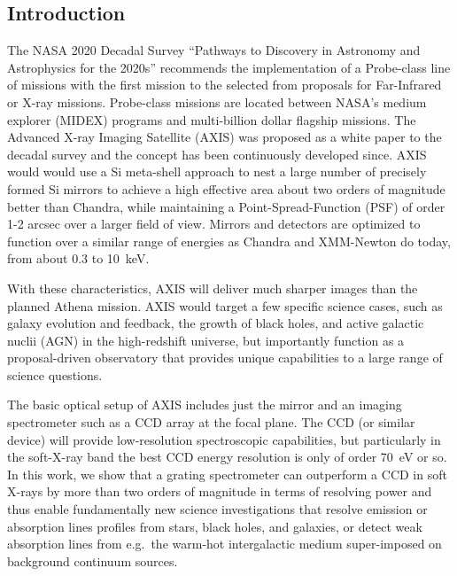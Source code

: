 \documentclass[12pt]{spieman}  %
\begin{document}
\begin{spacing}{1}



\section{Introduction}
\label{sect:introduction}
The NASA 2020 Decadal Survey ``Pathways to Discovery in Astronomy and Astrophysics for the 2020s''\cite{2021pdaa.book.....N} recommends the implementation of a Probe-class line of missions with the first mission to the selected from proposals for Far-Infrared or X-ray missions. Probe-class missions are located between NASA's medium explorer (MIDEX) programs and multi-billion dollar flagship missions. The Advanced X-ray Imaging Satellite (AXIS) was proposed as a white paper \cite{2019BAAS...51g.107M} to the decadal survey and the concept has been continuously developed since. AXIS would would use a Si meta-shell approach to nest a large number of precisely formed Si mirrors to achieve a high effective area about two orders of magnitude better than Chandra, while maintaining a Point-Spread-Function (PSF) of order 1-2 arcsec over a larger field of view. Mirrors and detectors are optimized to function over a similar range of energies as Chandra and XMM-Newton do today, from about 0.3 to 10~keV.

With these characteristics, AXIS will deliver much sharper images than the planned Athena mission\cite{doi:10.1117/12.2188988,doi:10.1117/12.2057347}. AXIS would target a few specific science cases, such as galaxy evolution and feedback, the growth of black holes, and active galactic nuclii (AGN) in the high-redshift universe, but importantly function as a proposal-driven observatory that provides unique capabilities to a large range of science questions.

The basic optical setup of AXIS includes just the mirror and an imaging spectrometer such as a CCD array at the focal plane. The CCD (or similar device) will provide low-resolution spectroscopic capabilities, but particularly in the soft-X-ray band the best CCD energy resolution is only of order 70~eV or so. In this work, we show that a grating spectrometer can outperform a CCD in soft X-rays by more than two orders of magnitude in terms of resolving power and thus enable fundamentally new science investigations that resolve emission or absorption lines profiles from stars, black holes, and galaxies, or detect weak absorption lines from e.g.\ the warm-hot intergalactic medium super-imposed on background continuum sources.


\end{spacing}
\end{document}

